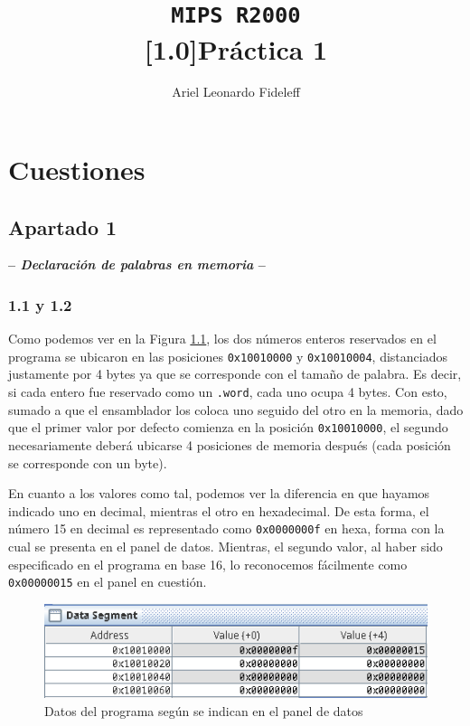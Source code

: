\documentclass[a4paper]{report}
\title{\Huge{}\texttt{MIPS R2000}\\\vspace{8pt}\Large{}\textbf{\scalebox{.85}[1.0]{Práctica 1}}}
\author{Ariel Leonardo Fideleff}
\begin{document}
\maketitle

\chapter{Cuestiones}

\section{Apartado 1}

\begin{center}
\large\textbf{-- \textsl{Declaración de palabras en memoria} --}
\end{center}

\subsection*{1.1 y 1.2}

Como podemos ver en la Figura \ref{fig:c1-1}, los dos números enteros reservados en el programa se ubicaron en las posiciones \texttt{0x10010000} y \texttt{0x10010004}, distanciados justamente por 4 bytes ya que se corresponde con el tamaño de palabra. Es decir, si cada entero fue reservado como un \texttt{.word}, cada uno ocupa 4 bytes. Con esto, sumado a que el ensamblador los coloca uno seguido del otro en la memoria, dado que el primer valor por defecto comienza en la posición \texttt{0x10010000}, el segundo necesariamente deberá ubicarse 4 posiciones de memoria después (cada posición se corresponde con un byte).

En cuanto a los valores como tal, podemos ver la diferencia en que hayamos indicado uno en decimal, mientras el otro en hexadecimal. De esta forma, el número 15 en decimal es representado como \texttt{0x0000000f} en hexa, forma con la cual se presenta en el panel de datos. Mientras, el segundo valor, al haber sido especificado en el programa en base 16, lo reconocemos fácilmente como \texttt{0x00000015} en el panel en cuestión.

\begin{figure}[h]
    \centering
    \includegraphics[width=.7\linewidth]{img/c1-1}
    \caption{Datos del programa según se indican en el panel de datos}
    \label{fig:c1-1}
\end{figure}
\end{document}

